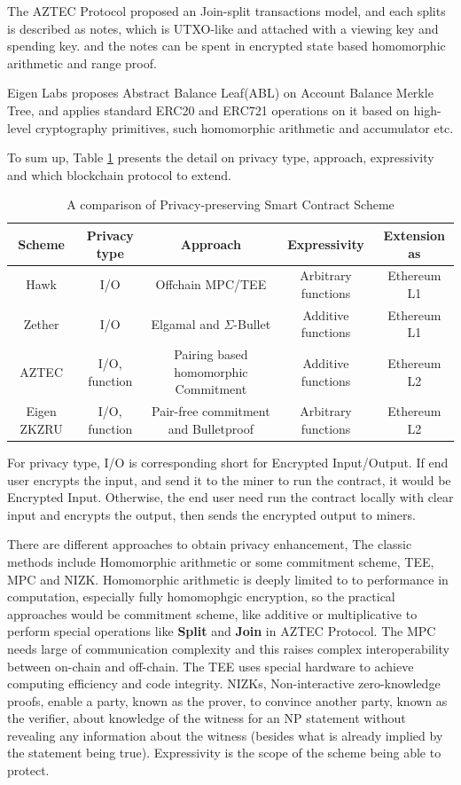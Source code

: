 \documentclass{article}
\begin{document}

The AZTEC Protocol \cite{williamson2018aztec} proposed an Join-split transactions model, and each splits is described as notes, which is UTXO-like and attached with a viewing key and spending key. and the notes can be spent in encrypted state based homomorphic arithmetic and range proof. 

Eigen Labs proposes Abstract Balance Leaf(ABL) on Account Balance Merkle Tree, and applies standard ERC20 and ERC721 operations on it based on high-level cryptography primitives, such homomorphic arithmetic and accumulator etc.

To sum up, Table \ref{tab:compare} presents the detail on privacy type, approach, expressivity and which blockchain protocol to extend.  


\begin{table}
\resizebox{\textwidth}{!} {
\begin{tabular}{c|c|c|c|c}
Scheme & Privacy type & Approach & Expressivity & Extension as \\\hline
Hawk & I/O & Offchain MPC/TEE & Arbitrary functions & Ethereum L1 \\
Zether & I/O & Elgamal and $\Sigma$-Bullet & Additive functions & Ethereum L1\\
AZTEC & I/O, function & Pairing based homomorphic Commitment & Additive functions & Ethereum L2\\
Eigen ZKZRU & I/O, function & Pair-free commitment and Bulletproof & Arbitrary functions & Ethereum L2
\end{tabular}
}
\caption{\label{tab:compare}A comparison of Privacy-preserving Smart Contract Scheme}
\end{table}

For privacy type, I/O is corresponding short for Encrypted Input/Output. If end user encrypts the input, and send it to the miner to run the contract, it would be Encrypted Input. Otherwise, the end user need run the contract locally with clear input and encrypts the output, then sends the encrypted output to miners.

There are different approaches to obtain privacy enhancement, The classic methods include Homomorphic arithmetic or some commitment scheme, TEE, MPC and NIZK. Homomorphic arithmetic is deeply limited to to performance in computation, especially fully homomophgic encryption, so the practical approaches would be commitment scheme, like additive or multiplicative to perform special operations like \textbf{Split} and \textbf{Join} in AZTEC Protocol. The MPC needs large of communication complexity and this raises complex interoperability between on-chain and off-chain. The TEE uses special hardware to achieve computing efficiency and code integrity. NIZKs, Non-interactive zero-knowledge proofs, enable a party, known as the prover, to convince another party, known as the verifier, about knowledge of the witness for an NP statement without revealing any information about the witness (besides what is already implied by the statement being true). 
Expressivity is the scope of the scheme being able to protect.
\end{document}
